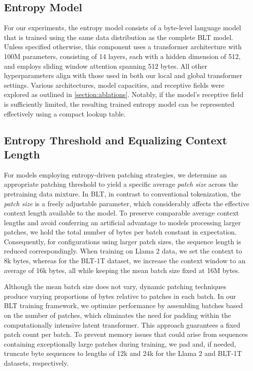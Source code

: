 \subsection{Entropy Model}  
For our experiments, the entropy model consists of a byte-level language model that is trained using the same data distribution as the complete {\textsc BLT} model. Unless specified otherwise, this component uses a transformer architecture with 100M parameters, consisting of 14 layers, each with a hidden dimension of 512, and employs sliding window attention spanning 512 bytes. All other hyperparameters align with those used in both our local and global transformer settings. Various architectures, model capacities, and receptive fields were explored as outlined in \autoref{section:ablations}. Notably, if the model's receptive field is sufficiently limited, the resulting trained entropy model can be represented effectively using a compact lookup table.

\subsection{Entropy Threshold and Equalizing Context Length} For models employing entropy-driven patching strategies, we determine an appropriate patching threshold to yield a specific average \textit{patch size} across the pretraining data mixture. In {\textsc BLT}, in contrast to conventional tokenization, the \textit{patch size} is a freely adjustable parameter, which considerably affects the effective context length available to the model. To preserve comparable average context lengths and avoid conferring an artificial advantage to models processing larger patches, we hold the total number of bytes per batch constant in expectation. Consequently, for configurations using larger patch sizes, the sequence length is reduced correspondingly. When training on Llama 2 data, we set the context to 8k bytes, whereas for the {\textsc BLT}-1T dataset, we increase the context window to an average of 16k bytes, all while keeping the mean batch size fixed at 16M bytes.

Although the mean batch size does not vary, dynamic patching techniques produce varying proportions of bytes relative to patches in each batch. In our {\textsc BLT} training framework, we optimize performance by assembling batches based on the number of patches, which eliminates the need for padding within the computationally intensive latent transformer. This approach guarantees a fixed patch count per batch. To prevent memory issues that could arise from sequences containing exceptionally large patches during training, we pad and, if needed, truncate byte sequences to lengths of 12k and 24k for the Llama 2 and {\textsc BLT}-1T datasets, respectively.

